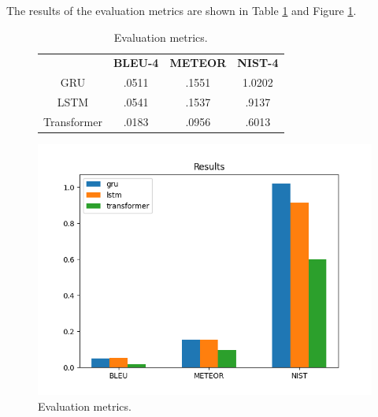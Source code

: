 \documentclass[12pt]{article}
\theoremstyle{plain}
\theoremstyle{definition}
\theoremstyle{remark}
\begin{document}
The results of the evaluation metrics are shown in Table \ref{tab:results} and Figure \ref{fig:results}.
\begin{figure}[H]
    \centering
    \begin{minipage}{0.4\textwidth}
        \begin{table}[H]
            \centering
            \fontsize{8}{10}\selectfont
            \begin{tabular}{c|c|c|c}
                            & \textbf{BLEU-4} & \textbf{METEOR} & \textbf{NIST-4} \\
                GRU         & .0511           & .1551           & 1.0202          \\
                LSTM        & .0541           & .1537           & .9137           \\
                Transformer & .0183           & .0956           & .6013
            \end{tabular}
            \caption{Evaluation metrics.}\label{tab:results}
        \end{table}
    \end{minipage}
    \hfill
    \begin{minipage}{0.5\textwidth}
        \centering
        \includegraphics[width=.9\textwidth]{res/metrics.png}
        \caption{Evaluation metrics.}\label{fig:results}
    \end{minipage}
\end{figure}
\end{document}
